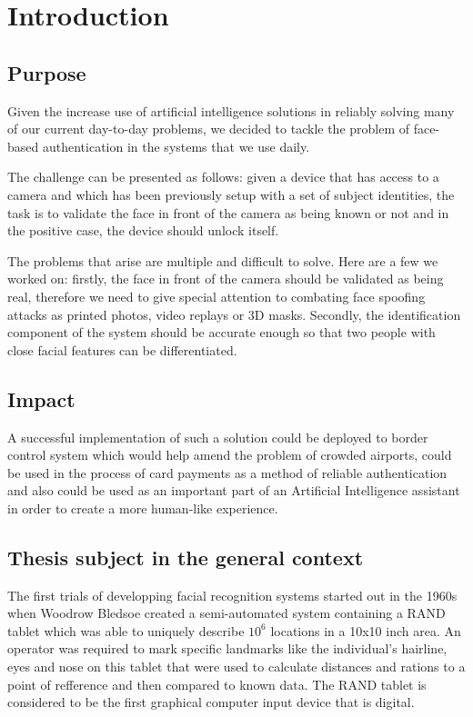 \chapter{Introduction}

\section{Purpose}

Given the increase use of artificial intelligence solutions in reliably solving many of our current day-to-day problems, we decided to tackle the problem of face-based authentication in the systems that we use daily.

The challenge can be presented as follows: given a device that has access to a camera and which has been previously setup with a set of subject identities, the task is to validate the face in front of the camera as being known or not and in the positive case, the device should unlock itself.

The problems that arise are multiple and difficult to solve. Here are a few we worked on: firstly, the face in front of the camera should be validated as being real, therefore we need to give special attention to combating face spoofing attacks as printed photos, video replays or 3D masks. Secondly, the identification component of the system should be accurate enough so that two people with close facial features can be differentiated.

\section{Impact}
A successful implementation of such a solution could be deployed to border control system which would help amend the problem of crowded airports, could be used in the process of card payments as a method of reliable authentication and also could be used as an important part of an Artificial Intelligence assistant in order to create a more human-like experience.

\section{Thesis subject in the general context}
The first trials of developping facial recognition systems started out in the 1960s when Woodrow Bledsoe created a semi-automated system \cite{DavisMRETO64} containing a RAND tablet which was able to uniquely describe $10^{6}$ locations in a 10x10 inch area.
An operator was required to mark specific landmarks like the individual's  hairline, eyes and nose on this tablet that were used to calculate distances and rations to a point of refference and then compared to known data. The RAND tablet is considered to be the first graphical computer input device that is digital.

